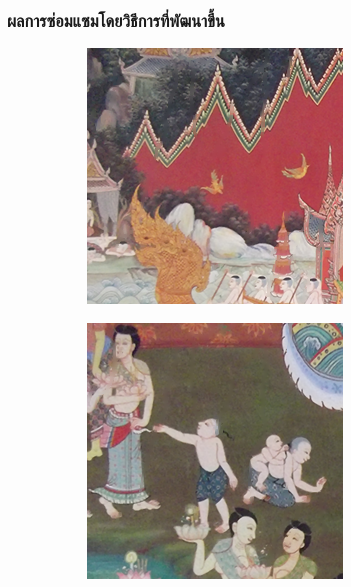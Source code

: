 \documentclass[xcolor=dvipsnames, xetex,serif]{beamer}
\numberwithin{equation}{section}
\begin{document}
		\begin{frame}
			\frametitle{ผลการซ่อมแซมโดยวิธีการที่พัฒนาขึ้น}
			\begin{figure}[H]
				\centering
				\begin{subfigure}{0.3\linewidth}
					\centering
					\includegraphics[width=0.7\linewidth]{images/result_ex4/multisplitbergman_case01.png}
				\end{subfigure}
				\begin{subfigure}{0.3\linewidth}
					\centering
					\includegraphics[width=0.7\linewidth]{images/result_ex4/multisplitbergman_case02.png}
				\end{subfigure}
				\vspace{1cm}
				\begin{subfigure}{0.3\linewidth}
					\centering

\end{subfigure}
\end{figure}
\end{frame}
\end{document}
